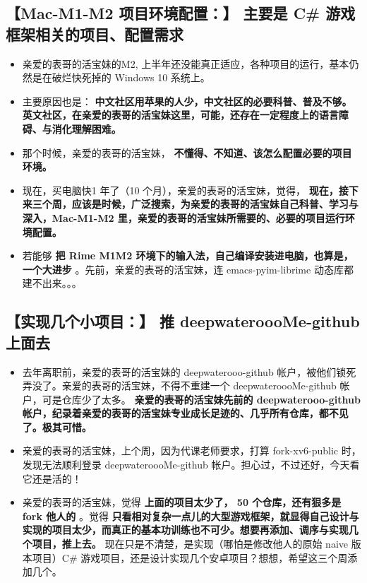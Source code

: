 \documentclass[9pt, b5paper]{article}
\begin{document}
\subsection{\textbf{【Mac-M1-M2 项目环境配置：】} 主要是 \textbf{C\# 游戏框架相关的项目、配置需求}}
\label{sec-1-2}
\begin{itemize}
\item 亲爱的表哥的活宝妹的M2, 上半年还没能真正适应，各种项目的运行，基本仍然是在破烂快死掉的 Windows 10 系统上。
\item 主要原因也是： \textbf{中文社区用苹果的人少，中文社区的必要科普、普及不够。英文社区，在亲爱的表哥的活宝妹这里，可能，还存在一定程度上的语言障碍、与消化理解困难。}
\item 那个时候，亲爱的表哥的活宝妹， \textbf{不懂得、不知道、该怎么配置必要的项目环境。}
\item 现在，买电脑快1 年了（10 个月），亲爱的表哥的活宝妹，觉得， \textbf{现在，接下来三个周，应该是时候，广泛搜索，为亲爱的表哥的活宝妹自己科普、学习与深入，Mac-M1-M2 里，亲爱的表哥的活宝妹所需要的、必要的项目运行环境配置。}
\item 若能够 \textbf{把 Rime M1M2 环境下的输入法，自己编译安装进电脑，也算是，一个大进步} 。先前，亲爱的表哥的活宝妹，连 emacs-pyim-librime 动态库都建不出来。。。
\end{itemize}
\subsection{\textbf{【实现几个小项目：】} 推 deepwateroooMe-github 上面去}
\label{sec-1-3}
\begin{itemize}
\item 去年离职前，亲爱的表哥的活宝妹的 deepwaterooo-github 帐户，被他们锁死弄没了。亲爱的表哥的活宝妹，不得不重建一个 deepwateroooMe-github 帐户，可是仓库少了太多。 \textbf{亲爱的表哥的活宝妹先前的 deepwaterooo-github 帐户，纪录着亲爱的表哥的活宝妹专业成长足迹的、几乎所有仓库，都不见了。极其可惜。}
\item 亲爱的表哥的活宝妹，上个周，因为代课老师要求，打算 fork-xv6-public 时，发现无法顺利登录 deepwateroooMe-github 帐户。担心过，不过还好，今天看它还是活的！
\item 亲爱的表哥的活宝妹，觉得 \textbf{上面的项目太少了， 50 个仓库，还有狠多是 fork 他人的} 。觉得 \textbf{只看相对复杂一点儿的大型游戏框架，就显得自己设计与实现的项目太少，而真正的基本功训练也不可少。想要再添加、调序与实现几个项目，推上去。} 现在只是不清楚，是实现（哪怕是修改他人的原始 naive 版本项目）C\# 游戏项目，还是设计实现几个安卓项目？想想，希望这三个周添加几个。
\end{itemize}
\end{document}
